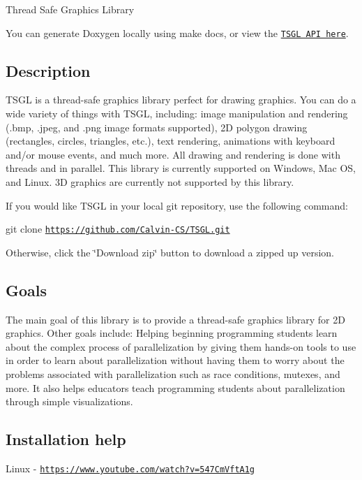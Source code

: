 Thread Safe Graphics Library

You can generate Doxygen locally using \textquotesingle{}make docs\textquotesingle{}, or view the \href{http://calvin-cs.github.io/TSGL/html/index.html}{\tt T\+S\+G\+L A\+P\+I here}. 

 \subsection*{Description }

T\+S\+G\+L is a thread-\/safe graphics library perfect for drawing graphics. You can do a wide variety of things with T\+S\+G\+L, including\+: image manipulation and rendering (.bmp, .jpeg, and .png image formats supported), 2\+D polygon drawing (rectangles, circles, triangles, etc.), text rendering, animations with keyboard and/or mouse events, and much more. All drawing and rendering is done with threads and in parallel. This library is currently supported on Windows, Mac O\+S, and Linux. 3\+D graphics are currently not supported by this library.

If you would like T\+S\+G\+L in your local git repository, use the following command\+:

git clone \href{https://github.com/Calvin-CS/TSGL.git}{\tt https\+://github.\+com/\+Calvin-\/\+C\+S/\+T\+S\+G\+L.\+git}

Otherwise, click the \char`\"{}\+Download zip\char`\"{} button to download a zipped up version. 

 \subsection*{Goals }

The main goal of this library is to provide a thread-\/safe graphics library for 2\+D graphics. Other goals include\+: Helping beginning programming students learn about the complex process of parallelization by giving them hands-\/on tools to use in order to learn about parallelization without having them to worry about the problems associated with parallelization such as race conditions, mutexes, and more. It also helps educators teach programming students about parallelization through simple visualizations. 

 \subsection*{Installation help }

Linux -\/ \href{https://www.youtube.com/watch?v=547CmVftA1g}{\tt https\+://www.\+youtube.\+com/watch?v=547\+Cm\+Vft\+A1g}

